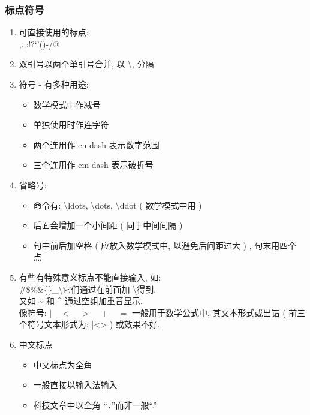 \documentclass[UTF8]{ctexart}
\begin{document}
        \subsubsection{标点符号}

            \begin{enumerate}

                \item 可直接使用的标点: 
                \\,\quad.\quad;\quad:\quad!\quad?\quad`\quad'\quad(\quad)\quad[\quad]\quad-\quad/\quad*\quad @

                \item 双引号以两个单引号合并, 以 \textbackslash , 分隔. 

                \item 符号 - 有多种用途: 
                \begin{itemize}
                    \item 数学模式中作减号
                    \item 单独使用时作连字符
                    \item 两个连用作 en dash 表示数字范围
                    \item 三个连用作 em dash 表示破折号
                \end{itemize}

                \item 省略号: 
                \begin{itemize}
                    \item 命令有: \textbackslash ldots, \textbackslash dots, \textbackslash ddot ( 数学模式中用 )
                    \item 后面会增加一个小间距 ( 同于中间间隔 )
                    \item 句中前后加空格 ( 应放入数学模式中, 以避免后间距过大 ) , 句末用四个点. 
                \end{itemize}

                \item 有些有特殊意义标点不能直接输入, 如: 
                \\\#\quad\$\quad\%\quad\&\quad\{\quad\}\quad\_\quad\textbackslash 它们通过在前面加 \textbackslash 得到. 
                \\ 又如 \~{} 和 \^{} 通过空组加重音显示. 
                \\ 像符号: $|\quad <\quad >\quad +\quad =$ 一般用于数学公式中, 其文本形式或出错 ( 前三个符号文本形式为: |\quad<\quad> ) 或效果不好. 

                \item 中文标点
                \begin{itemize}
                    \item 中文标点为全角
                    \item 一般直接以输入法输入
                    \item 科技文章中以全角 ``．''而非一般``.''
                \end{itemize}

            \end{enumerate}
\end{document}
